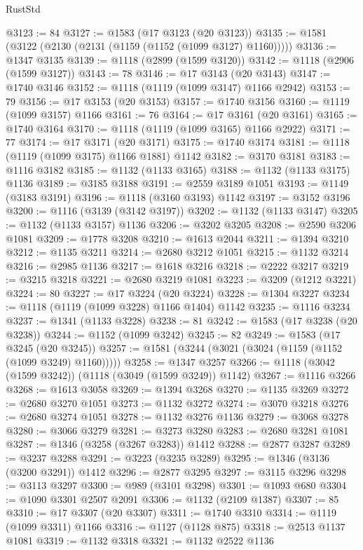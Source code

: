 \begin{lexlean}{RustStd}
\begin{coremodule}
@3123 := 84
@3127 := @1583 (@17 @3123 (@20 @3123))
@3135 := @1581 (@3122 (@2130 (@2131 (@1159 (@1152 (@1099 @3127) @1160)))))
@3136 := @1347 @3135
@3139 := @1118 (@2899 (@1599 @3120))
@3142 := @1118 (@2906 (@1599 @3127))
@3143 := 78
@3146 := @17 @3143 (@20 @3143)
@3147 := @1740 @3146
@3152 := @1118 (@1119 (@1099 @3147) @1166 @2942)
@3153 := 79
@3156 := @17 @3153 (@20 @3153)
@3157 := @1740 @3156
@3160 := @1119 (@1099 @3157) @1166
@3161 := 76
@3164 := @17 @3161 (@20 @3161)
@3165 := @1740 @3164
@3170 := @1118 (@1119 (@1099 @3165) @1166 @2922)
@3171 := 77
@3174 := @17 @3171 (@20 @3171)
@3175 := @1740 @3174
@3181 := @1118 (@1119 (@1099 @3175) @1166 @1881) @1142
@3182 := @3170 @3181
@3183 := @1116 @3182
@3185 := @1132 (@1133 @3165)
@3188 := @1132 (@1133 @3175) @1136
@3189 := @3185 @3188
@3191 := @2559 @3189 @1051
@3193 := @1149 (@3183 @3191)
@3196 := @1118 (@3160 @3193) @1142
@3197 := @3152 @3196
@3200 := @1116 (@3139 (@3142 @3197))
@3202 := @1132 (@1133 @3147)
@3205 := @1132 (@1133 @3157) @1136
@3206 := @3202 @3205
@3208 := @2590 @3206 @1081
@3209 := @1778 @3208
@3210 := @1613 @2044
@3211 := @1394 @3210
@3212 := @1135 @3211
@3214 := @2680 @3212 @1051
@3215 := @1132 @3214
@3216 := @2985 @1136
@3217 := @1618 @3216
@3218 := @2222 @3217
@3219 := @3215 @3218
@3221 := @2680 @3219 @1081
@3223 := @3209 (@1212 @3221)
@3224 := 80
@3227 := @17 @3224 (@20 @3224)
@3228 := @1304 @3227
@3234 := @1118 (@1119 (@1099 @3228) @1166 @1404) @1142
@3235 := @1116 @3234
@3237 := @1341 (@1133 @3228)
@3238 := 81
@3242 := @1583 (@17 @3238 (@20 @3238))
@3244 := @1152 (@1099 @3242)
@3245 := 82
@3249 := @1583 (@17 @3245 (@20 @3245))
@3257 := @1581 (@3244 (@3021 (@3024 (@1159 (@1152 (@1099 @3249) @1160)))))
@3258 := @1347 @3257
@3266 := @1118 (@3042 (@1599 @3242)) (@1118 (@3049 (@1599 @3249)) @1142)
@3267 := @1116 @3266
@3268 := @1613 @3058
@3269 := @1394 @3268
@3270 := @1135 @3269
@3272 := @2680 @3270 @1051
@3273 := @1132 @3272
@3274 := @3070 @3218
@3276 := @2680 @3274 @1051
@3278 := @1132 @3276 @1136
@3279 := @3068 @3278
@3280 := @3066 @3279
@3281 := @3273 @3280
@3283 := @2680 @3281 @1081
@3287 := @1346 (@3258 (@3267 @3283)) @1412
@3288 := @2877 @3287
@3289 := @3237 @3288
@3291 := @3223 (@3235 @3289)
@3295 := @1346 (@3136 (@3200 @3291)) @1412
@3296 := @2877 @3295
@3297 := @3115 @3296
@3298 := @3113 @3297
@3300 := @989 (@3101 @3298)
@3301 := @1093 @680
@3304 := @1090 @3301 @2507 @2091
@3306 := @1132 (@2109 @1387)
@3307 := 85
@3310 := @17 @3307 (@20 @3307)
@3311 := @1740 @3310
@3314 := @1119 (@1099 @3311) @1166
@3316 := @1127 (@1128 @875)
@3318 := @2513 @1137 @1081
@3319 := @1132 @3318
@3321 := @1132 @2522 @1136

\end{coremodule}
\end{lexlean}

